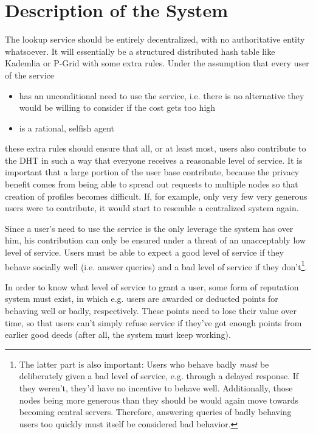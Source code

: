 \documentclass[10pt]{article}
\begin{document}
\section*{Description of the System}
The lookup service should be entirely decentralized, with no authoritative
entity whatsoever. It will essentially be a structured distributed hash table
like Kademlia\cite{maymounkov2002kademlia} or P-Grid\cite{aberer2003p} with some
extra rules. Under the assumption that every user of the service
\begin{itemize}
\item has an unconditional need to use the service, i.e. there is no alternative
they would be willing to consider if the cost gets too high
\item is a rational, selfish agent
\end{itemize}
these extra rules should ensure that all, or at least most, users also
contribute to the DHT in such a way that everyone receives a reasonable level of
service. It is important that a large portion of the user base contribute,
because the privacy benefit comes from being able to spread out requests to
multiple nodes so that creation of profiles becomes difficult. If, for example,
only very few very generous users were to contribute, it would start to resemble
a centralized system again.

Since a user's need to use the service is the only leverage the system has over
him, his contribution can only be ensured under a threat of an unacceptably low
level of service. Users must be able to expect a good level of service if they
behave socially well (i.e. answer queries) and a bad level of service if they
don't\footnote{The latter part is also important: Users who behave badly
\emph{must} be deliberately given a bad level of service, e.g. through a delayed
response. If they weren't, they'd have no incentive to behave well.
Additionally, those nodes being more generous than they should be would again
move towards becoming central servers. Therefore, answering queries of badly
behaving users too quickly must itself be considered bad behavior.}.

In order to know what level of service to grant a user, some form of reputation
system must exist, in which e.g. users are awarded or deducted points for
behaving well or badly, respectively. These points need to lose their value over
time, so that users can't simply refuse service if they've got enough points
from earlier good deeds (after all, the system must keep working).
\end{document}
